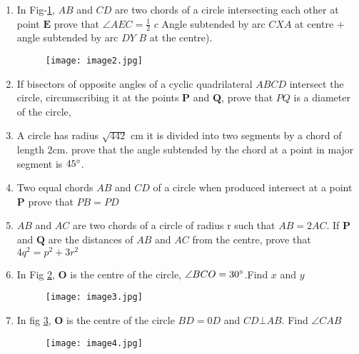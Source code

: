\documentclass[12pt]{article}
\let\vec\mathbf
\begin{document}
\begin{enumerate}
	\item In Fig-\ref{fig:2}, $AB$ and $CD$ are two chords of a circle intersecting each other at point $\vec{E}$ prove that $\angle AEC=\frac{1}{2}$ $c$ Angle subtended by arc $CXA$ at centre + angle subtended by arc $DY$ $B$ at the centre).
	\begin{figure}[h!]                        \begin{center}                                   \texttt{[image: image2.jpg]}                          \end{center}                            \caption{}                                       \label{fig:2}                    \end{figure}
	\item If bisectors of opposite angles of a cyclic quadrilateral $ABCD$ intersect the circle, circumscribing it at the points $\vec{P}$ and $\vec{Q}$, prove that $PQ$ is a diameter of the circle,
\item A circle has radius $\sqrt{442}$ cm it is divided into two segments by a chord of length 2cm. prove that the angle subtended by the chord at a point in major segment is $45\degree$.
\item Two equal chords $AB$ and $CD$ of a circle when produced intersect at a point $\vec{P}$ prove that $PB=PD$
\item $AB$ and $AC$ are two chords of a circle of radius r such that $AB=2AC$. If $\vec{P}$ and $\vec{Q}$ are the distances of $AB$ and $AC$ from the centre, prove that $4q^2=p^2+3r^2$
\item In Fig \ref{fig:3}, $\vec{O}$ is the centre of the circle, $\angle BCO=30\degree$.Find $x$ and $y$
	\begin{figure}[h!]                        \begin{center}                                   \texttt{[image: image3.jpg]}                          \end{center}                            \caption{}                                       \label{fig:3}                    \end{figure}
	\item In fig \ref{fig:4}, $\vec{O}$ is the centre of the circle $BD=0D$ and $CD \bot AB$. Find $\angle CAB$
	\begin{figure}[h!]                        \begin{center}                                   \texttt{[image: image4.jpg]}                          \end{center}                            \caption{}                                       \label{fig:4}                    \end{figure}
\end{enumerate}

	
\end{document}
